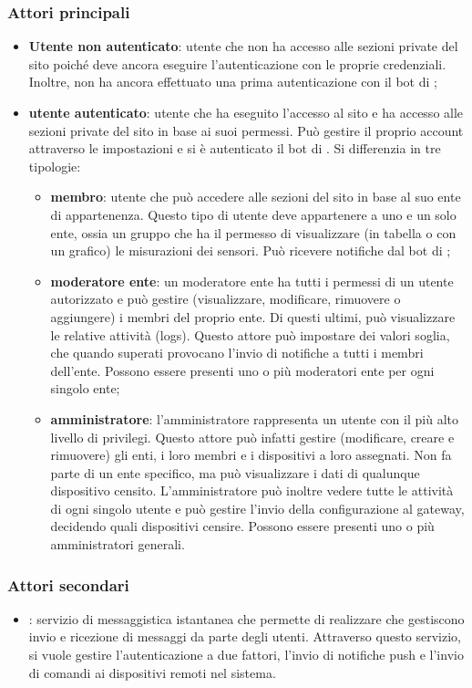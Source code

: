 		\subsubsection{Attori principali}
		\begin{itemize}
			\item \textbf{Utente non autenticato}: utente che non ha accesso alle sezioni private del sito poiché deve ancora eseguire l'autenticazione con le proprie credenziali. Inoltre, non ha ancora effettuato una prima autenticazione con il bot di ;

			\item \textbf{utente autenticato}: utente che ha eseguito l'accesso al sito e ha accesso alle sezioni private del sito in base ai suoi permessi. Può gestire il proprio account attraverso le impostazioni e si è autenticato il bot di . Si differenzia in tre tipologie:

			\begin{itemize}
				\item \textbf{membro}: utente che può accedere alle sezioni del sito in base al suo ente di appartenenza. Questo tipo di utente deve appartenere a uno e un solo ente, ossia un gruppo che ha il permesso di visualizzare (in tabella o con un grafico) le misurazioni dei sensori. Può ricevere notifiche dal bot di ;

				\item \textbf{moderatore ente}: un moderatore ente ha tutti i permessi di un utente autorizzato e può gestire (visualizzare, modificare, rimuovere o aggiungere) i membri del proprio ente. Di questi ultimi, può visualizzare le relative attività (logs).
				Questo attore può impostare dei valori soglia, che quando superati provocano l'invio di notifiche a tutti i membri dell'ente.
				Possono essere presenti uno o più moderatori ente per ogni singolo ente;

				\item \textbf{amministratore}: l'amministratore rappresenta un utente con il più alto livello di privilegi. Questo attore può infatti gestire (modificare, creare e rimuovere) gli enti, i loro membri e i dispositivi a loro assegnati. Non fa parte di un ente specifico, ma può visualizzare i dati di qualunque dispositivo censito.
				L'amministratore può inoltre vedere tutte le attività di ogni singolo utente e può gestire l'invio della configurazione al gateway, decidendo quali dispositivi censire.
				Possono essere presenti uno o più amministratori generali.
			\end{itemize}
		\end{itemize}
		\subsubsection{Attori secondari}
			\begin{itemize}
				\item {}: servizio di messaggistica istantanea che permette di realizzare  che gestiscono invio e ricezione di messaggi da parte degli utenti. Attraverso questo servizio, si vuole gestire l'autenticazione a due fattori, l'invio di notifiche push e l'invio di comandi ai dispositivi remoti nel sistema.
			\end{itemize}

